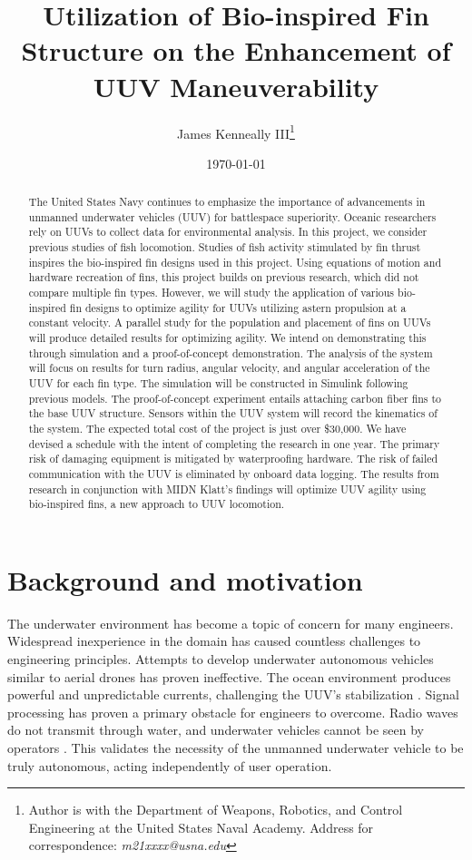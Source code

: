 \documentclass{IEEEtran}
\title{Utilization of Bio-inspired Fin Structure on the Enhancement of UUV Maneuverability}
\author{James Kenneally III\thanks{Author is with the Department of Weapons, Robotics, and Control Engineering at the United States Naval Academy. Address for correspondence: \emph{m21xxxx@usna.edu}}}
\date{\today}
\begin{document}
\maketitle
\begin{abstract}
The United States Navy continues to emphasize the importance of advancements in unmanned underwater vehicles (UUV) for battlespace superiority.  Oceanic researchers rely on UUVs to collect data for environmental analysis.  In this project, we consider previous studies of fish locomotion.  Studies of fish activity stimulated by fin thrust inspires the bio-inspired fin designs used in this project.  Using equations of motion and hardware recreation of fins, this project builds on previous research, which did not compare multiple fin types.  However, we will study the application of various bio-inspired fin designs to optimize agility for UUVs utilizing astern propulsion at a constant velocity.  A parallel study for the population and placement of fins on UUVs will produce detailed results for optimizing agility.  We intend on demonstrating this through simulation and a proof-of-concept demonstration.  The analysis of the system will focus on results for turn radius, angular velocity, and angular acceleration of the UUV for each fin type.  The simulation will be constructed in Simulink following previous models.  The proof-of-concept experiment entails attaching carbon fiber fins to the base UUV structure.  Sensors within the UUV system will record the kinematics of the system.  The expected total cost of the project is just over \$30,000.  We have devised a schedule with the intent of completing the research in one year.  The primary risk of damaging equipment is mitigated by waterproofing hardware.  The risk of failed communication with the UUV is eliminated by onboard data logging.  The results from research in conjunction with MIDN Klatt’s findings will optimize UUV agility using bio-inspired fins, a new approach to UUV locomotion.  
\end{abstract}

\section{Background and motivation}
The underwater environment has become a topic of concern for many engineers.  Widespread inexperience in the domain has caused countless challenges to engineering principles.  Attempts to develop underwater autonomous vehicles similar to aerial drones has proven ineffective.  The ocean environment produces powerful and unpredictable currents, challenging the UUV’s stabilization \cite{risen2019underwater}.  Signal processing has proven a primary obstacle for engineers to overcome.  Radio waves do not transmit through water, and underwater vehicles cannot be seen by operators \cite{risen2019underwater}.  This validates the necessity of the unmanned underwater vehicle to be truly autonomous, acting independently of user operation.  
\end{document}
